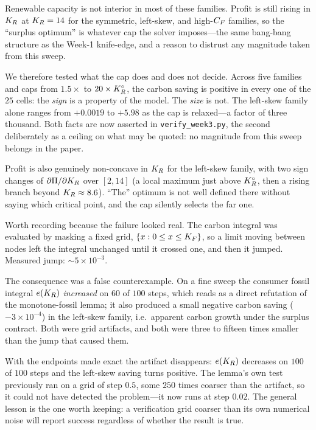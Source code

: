 \begin{remark}
\label{r1w3-rem:capinv}
Renewable capacity is not interior in most of these families. Profit is still rising in
$K_R$ at $K_R=14$ for the symmetric, left-skew, and high-$C_F$ families, so the ``surplus
optimum'' is whatever cap the solver imposes---the same bang-bang structure as the Week-1
knife-edge, and a reason to distrust any magnitude taken from this sweep.

We therefore tested what the cap does and does not decide. Across five families and caps
from $1.5\times$ to $20\times K_R^{\circ}$, the carbon saving is positive in every one of the
$25$ cells: the \emph{sign} is a property of the model. The \emph{size} is not. The
left-skew family alone ranges from $+0.0019$ to $+5.98$ as the cap is relaxed---a factor of
three thousand. Both facts are now asserted in \texttt{verify\_week3.py}, the second
deliberately as a ceiling on what may be quoted: no magnitude from this sweep belongs in the
paper.

Profit is also genuinely non-concave in $K_R$ for the left-skew family, with two sign changes
of $\partial\Pi/\partial K_R$ over $[2,14]$ (a local maximum just above $K_R^{\circ}$, then a
rising branch beyond $K_R\approx8.6$). ``The'' optimum is not well defined there without
saying which critical point, and the cap silently selects the far one.
\end{remark}

\begin{remark}
\label{r1w3-rem:quadfix}
Worth recording because the failure looked real. The carbon integral was evaluated by
masking a fixed grid, $\{x: 0\le x\le K_F\}$, so a limit moving between nodes left the
integral unchanged until it crossed one, and then it jumped. Measured jump: $\sim5\times
10^{-3}$.

The consequence was a false counterexample. On a fine sweep the consumer fossil integral
$e(K_R)$ \emph{increased} on $60$ of $100$ steps, which reads as a direct refutation of the
monotone-fossil lemma; it also produced a small negative carbon saving ($-3\times10^{-4}$)
in the left-skew family, i.e.\ apparent carbon growth under the surplus contract. Both were
grid artifacts, and both were three to fifteen times smaller than the jump that caused them.

With the endpoints made exact the artifact disappears: $e(K_R)$ decreases on $100$ of $100$
steps and the left-skew saving turns positive. The lemma's own test previously ran on a grid
of step $0.5$, some $250$ times coarser than the artifact, so it could not have detected the
problem---it now runs at step $0.02$. The general lesson is the one worth keeping: a
verification grid coarser than its own numerical noise will report success regardless of
whether the result is true.
\end{remark}
